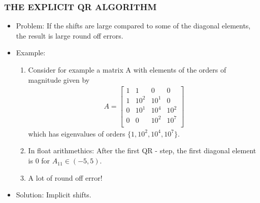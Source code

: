 \documentclass[a4paper,8pt]{beamer} %
\newcommand{\smatrix}[1]{\left[\begin{matrix} #1 \end{matrix}\right]}
\begin{document}
\begin{frame}%
	\frametitle{THE EXPLICIT QR ALGORITHM}
\begin{itemize}
	\item <1-> Problem: If the shifts are large compared to some of the diagonal elements, 
		the result is large round off errors.
	\item <2-> Example:
		\begin{enumerate}
			\item <2->
				Consider for example a matrix A with elements of the orders of
				magnitude given by
				\begin{align}
					A= \smatrix{
						1&1&0&0\\
						1&10^{2}&10^{1}&0\\
						0&10^{1}&10^{4}&10^{2}\\
						0&0&10^{2}&10^{7}\\
					}
				\end{align}
				which has eigenvalues of orders $\{1,10^2,10^4,10^{7}\}$. 
			\item <3-> In float arithmethics: After the first QR - step, 
				the first diagonal element is 0 for $A_{11}\in(-5,5)$.
			\item <4-> A lot of round off error!
		\end{enumerate}
	\item <5-> Solution: Implicit shifts.
\end{itemize}
\end{frame}%
\end{document}
